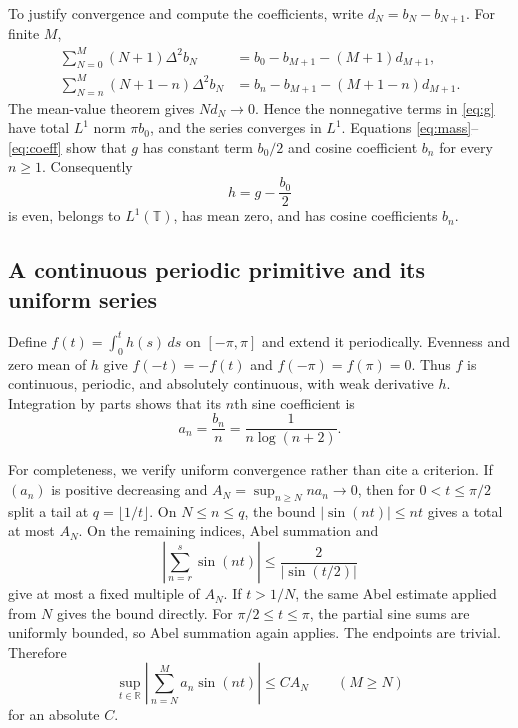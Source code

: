 \documentclass[11pt]{article}
\theoremstyle{remark}
\newcommand{\T}{\mathbb T}
\newcommand{\R}{\mathbb R}
\begin{document}
To justify convergence and compute the coefficients, write
$d_N=b_N-b_{N+1}$.  For finite $M$,
\begin{align}
 \sum_{N=0}^M(N+1)\Delta^2b_N
 &=b_0-b_{M+1}-(M+1)d_{M+1},                                      \label{eq:mass}\\
 \sum_{N=n}^M(N+1-n)\Delta^2b_N
 &=b_n-b_{M+1}-(M+1-n)d_{M+1}.                                   \label{eq:coeff}
\end{align}
The mean-value theorem gives $N d_N\to0$.  Hence the nonnegative terms in
\eqref{eq:g} have total $L^1$ norm $\pi b_0$, and the series converges in
$L^1$.  Equations \eqref{eq:mass}--\eqref{eq:coeff} show that $g$ has constant
term $b_0/2$ and cosine coefficient $b_n$ for every $n\geq1$.  Consequently
\begin{equation}\label{eq:h}
 h=g-\frac{b_0}{2}
\end{equation}
is even, belongs to $L^1(\T)$, has mean zero, and has cosine coefficients
$b_n$.

\subsection{A continuous periodic primitive and its uniform series}

Define $f(t)=\int_0^t h(s)\,ds$ on $[-\pi,\pi]$ and extend it periodically.
Evenness and zero mean of $h$ give $f(-t)=-f(t)$ and
$f(-\pi)=f(\pi)=0$.  Thus $f$ is continuous, periodic, and absolutely
continuous, with weak derivative $h$.  Integration by parts shows that its
$n$th sine coefficient is
\begin{equation}\label{eq:an}
 a_n=\frac{b_n}{n}=\frac1{n\log(n+2)}.
\end{equation}

For completeness, we verify uniform convergence rather than cite a criterion.
If $(a_n)$ is positive decreasing and
$A_N=\sup_{n\geq N}n a_n\to0$, then for $0<t\leq\pi/2$ split a tail at
$q=\lfloor1/t\rfloor$.  On $N\leq n\leq q$, the bound
$|\sin(nt)|\leq nt$ gives a total at most $A_N$.  On the remaining indices,
Abel summation and
\[
 \left|\sum_{n=r}^s\sin(nt)\right|\leq\frac{2}{|\sin(t/2)|}
\]
give at most a fixed multiple of $A_N$.  If $t>1/N$, the same Abel estimate
applied from $N$ gives the bound directly.  For $\pi/2\leq t\leq\pi$, the
partial sine sums are uniformly bounded, so Abel summation again applies.
The endpoints are trivial.  Therefore
\begin{equation}\label{eq:uniformtail}
 \sup_{t\in\R}\left|\sum_{n=N}^M a_n\sin(nt)\right|\leq C A_N
 \qquad(M\geq N)
\end{equation}
for an absolute $C$.
\end{document}
